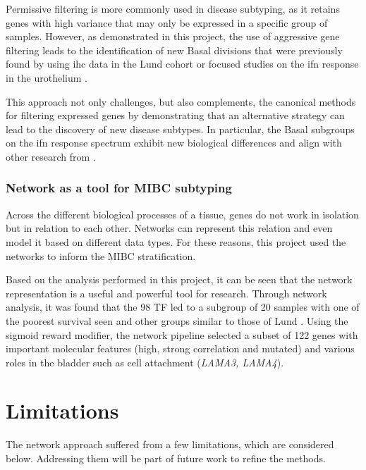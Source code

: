 Permissive filtering is more commonly used in disease subtyping, as it retains genes with high variance that may only be expressed in a specific group of samples. However, as demonstrated in this project, the use of aggressive gene filtering leads to the identification of new Basal divisions that were previously found by using \acrshort{ihc} data in the Lund cohort \citep{Marzouka2018-ge} or focused studies on the \acrshort{ifn} response in the urothelium \citep{Baker2022-bj}.

This approach not only challenges, but also complements, the canonical methods for filtering expressed genes by demonstrating that an alternative strategy can lead to the discovery of new disease subtypes. In particular, the Basal subgroups on the \acrshort{ifn} response spectrum exhibit new biological differences and align with other research from \citep{Marzouka2018-ge,Baker2022-bj}.


\subsubsection*{Network as a tool for MIBC subtyping}

Across the different biological processes of a tissue, genes do not work in isolation but in relation to each other. Networks can represent this relation and even model it based on different data types. For these reasons, this project used the networks to inform the MIBC stratification. 

Based on the analysis performed in this project, it can be seen that the network representation is a useful and powerful tool for research. Through network analysis, it was found that the 98 TF led to a subgroup of 20 samples with one of the poorest survival seen and other groups similar to those of Lund \citep{Marzouka2018-ge, Baker2022-bj}. Using the sigmoid reward modifier, the network pipeline selected a subset of 122 genes with important molecular features (high, strong correlation and mutated) and various roles in the bladder such as cell attachment (\textit{LAMA3, LAMA4}).

\section{Limitations} \label{s:limitations}

The network approach suffered from a few limitations, which are considered below. Addressing them will be part of future work to refine the methods.

